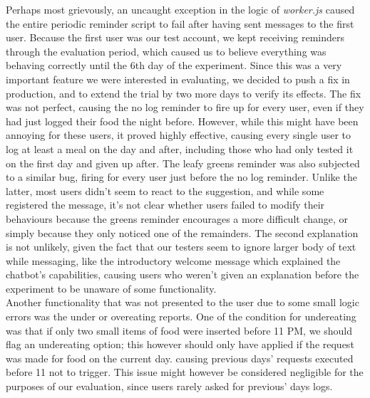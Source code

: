 Perhaps most grievously, an uncaught exception in the logic of \textit{worker.js} caused the entire periodic reminder script to fail after having sent messages to the first user. Because the first user was our test account, we kept receiving reminders through the evaluation period, which caused us to believe everything was behaving correctly until the 6th day of the experiment. Since this was a very important feature we were interested in evaluating, we decided to push a fix in production, and to extend the trial by two more days to verify its effects. The fix was not perfect, causing the no log reminder to fire up for every user, even if they had just logged their food the night before. However, while this might have been annoying for these users, it proved highly effective, causing every single user to log at least a meal on the day and after, including those who had only tested it on the first day and given up after. The leafy greens reminder was also subjected to a similar bug, firing for every user just before the no log reminder. Unlike the latter, most users didn't seem to react to the suggestion, and while some registered the message, it's not clear whether users failed to modify their behaviours because the greens reminder encourages a more difficult change, or simply because they only noticed one of the remainders. The second explanation is not unlikely, given the fact that our testers seem to ignore larger body of text while messaging, like the introductory welcome message which explained the chatbot's capabilities, causing users who weren't given an explanation before the experiment to be unaware of some functionality. \\
Another functionality that was not presented to the user due to some small logic errors was the under or overeating reports. One of the condition for undereating was that if only two small items of food were inserted before 11 PM, we should flag an undereating option; this however should only have applied if the request was made for food on the current day. causing previous days' requests executed before 11 not to trigger. This issue might however be considered negligible for the purposes of our evaluation, since users rarely asked for previous' days logs.
